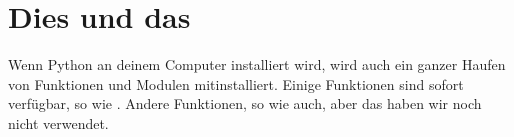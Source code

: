 \section{Dies und das} 

Wenn Python an deinem Computer installiert wird, wird auch ein ganzer Haufen von Funktionen und Modulen mitinstalliert. Einige Funktionen sind sofort verfügbar, so wie . Andere Funktionen, so wie  auch, aber das haben wir noch nicht verwendet.

